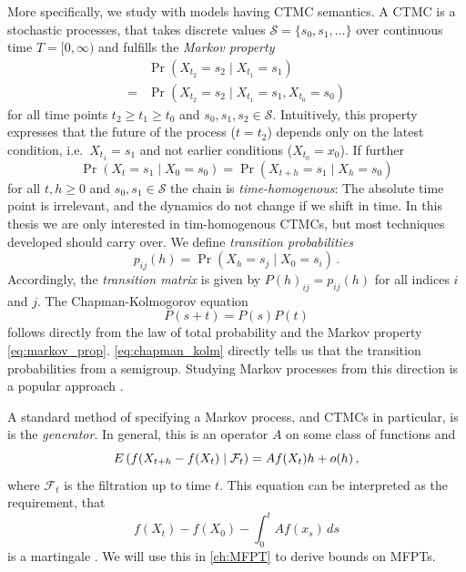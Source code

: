 More specifically, we study with models having \acf{CTMC} semantics.
A \ac{CTMC} is a stochastic processes, that takes discrete values $\mathcal{S}=\{s_0, s_1,\dots\}$ over continuous time $T=[0,\infty)$ and fulfills the \emph{Markov property}
\begin{equation}\label{eq:markov_prop}
	\begin{split}
		&\Pr\left({X_{t_2} = s_2 \mid X_{t_1} = s_1}\right) \\ = &\Pr\left({X_{t_2}=s_2 \mid X_{t_1} = s_1, X_{t_0} = s_0}\right)
	\end{split}
\end{equation}
for all time points $t_2 \geq t_1 \geq t_0$ and $s_0, s_1, s_2\in\mathcal{S}$.
Intuitively, this property expresses that the future of the process ($t=t_2$) depends only on the latest condition, i.e.\ $X_{t_1}=s_1$ and not earlier conditions ($X_{t_0}=x_0$).
If further
\begin{equation}\label{time_homo}
	\Pr\left(X_t=s_1\mid X_0 = s_0\right)
	=\Pr\left(X_{t+h}=s_1\mid X_h=s_0\right)
\end{equation}
for all $t,h\geq 0$ and $s_0, s_1\in\mathcal{S}$ the chain is \emph{time-homogenous}:
The absolute time point is irrelevant, and the dynamics do not change if we shift in time.
In this thesis we are only interested in tim-homogenous \acp{CTMC}, but most techniques 
developed should carry over.
We define \emph{transition probabilities}
\begin{equation}
	p_{ij}(h) = \Pr(X_h = s_j\mid X_0=s_i)\,.
\end{equation}
Accordingly, the \emph{transition matrix} is given by $P(h)_{ij} = p_{ij}(h)$ for all indices $i$ and $j$.
The Chapman-Kolmogorov equation
\begin{equation}\label{eq:chapman_kolm}
	P(s+t) = P(s)P(t)
\end{equation}
follows directly from the law of total probability and the Markov property \eqref{eq:markov_prop}.
\eqref{eq:chapman_kolm} directly tells us that the transition probabilities
from a semigroup.
Studying Markov processes from this direction is a popular approach \cite{ethier2009markov}.

A standard method of specifying a Markov process, and \acp{CTMC} in particular, is
is the \emph{generator}.
In general, this is an operator $A$ on some class of functions and
\begin{equation}
	{E}\left(f(X_{t+h} - f(X_t)\mid \mathcal{F}_t\right)
	=
	Af(X_t)h + o(h)\,,
\end{equation}
where $\mathcal{F}_t$ is the filtration up to time $t$.
This equation can be interpreted as the requirement, that
$$f(X_t) - f(X_0) - \int_0^t Af(x_s)\,ds$$ is a martingale \cite[p.~5]{kurtz1981approximation}.
We will use this in \autoref{ch:MFPT} to derive bounds on \aclp{MFPT}.

